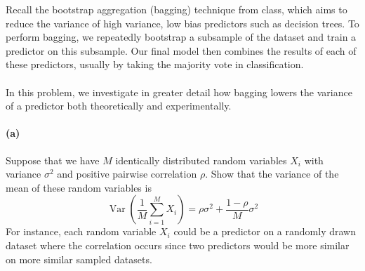 \documentclass{exam}
\DeclareMathOperator{\Var}{Var}
\begin{document}
Recall the bootstrap aggregation (bagging) technique from class, which aims to reduce the variance of high variance, low bias predictors such as decision trees. To perform bagging, we repeatedly bootstrap a subsample of the dataset and train a predictor on this subsample. Our final model then combines the results of each of these predictors, usually by taking the majority vote in classification.
\\\\
In this problem, we investigate in greater detail how bagging lowers the variance of a predictor both theoretically and experimentally. 

\paragraph{(a)} Suppose that we have $M$ identically distributed random variables $X_i$ with variance $\sigma^2$ and positive pairwise correlation $\rho$. Show that the variance of the mean of these random variables is
$$\Var\left(\frac{1}{M}\sum_{i=1}^M X_i\right)
 = \rho\sigma^2 + \frac{1-\rho}{M}\sigma^2$$
For instance, each random variable $X_i$ could be a predictor on a randomly drawn dataset where the correlation occurs since two predictors would be more similar on more similar sampled datasets.
\end{document}
